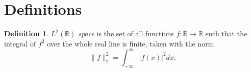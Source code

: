 \documentclass[11pt]{amsart}
\theoremstyle{theorem} %
\theoremstyle{definition}                  %
\newtheorem{defn}[thm]{Definition}
\theoremstyle{example}                       %
\theoremstyle{remark}                       %
\numberwithin{equation}{section}
\newcommand{\R}{\mathbb{R}}
\begin{document}
%
%
%
%
%
%
%
%
%

\section{Definitions}
\begin{defn} \label{def:l2}
	\emph{$ L^2(\R) $ space} is the set of all functions $ f: \R \to \R $ such that the integral of $ f^2 $ over the whole real line is finite, taken with the norm
	\[ \|f\|_2^2 = \int_{-\infty}^{\infty} |f(x)|^2 dx. \]
	
\end{defn}
\end{document}
